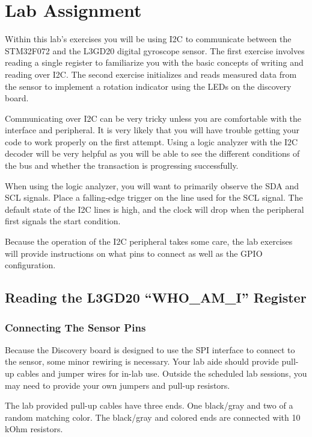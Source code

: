 \documentclass[openany,11pt,fleqn]{book} %
\begin{document}
\section{Lab Assignment}
Within this lab's exercises you will be using I2C to communicate between the STM32F072 and the L3GD20 digital gyroscope sensor. The first exercise involves reading a single register to familiarize you with the basic concepts of writing and reading over I2C. The second exercise initializes and reads measured data from the sensor to  implement a rotation indicator using the LEDs on the discovery board. 

Communicating over I2C can be very tricky unless you are comfortable with the interface and peripheral. It is very likely that you will have trouble getting your code to work properly on the first attempt. Using a logic analyzer with the I2C decoder will be very helpful as you will be able to see the different conditions of the bus and whether the transaction is progressing successfully. 

When using the logic analyzer, you will want to primarily observe the SDA and SCL signals. Place a falling-edge trigger on the line used for the SCL signal. The default state of the I2C lines is high, and the clock will drop when the peripheral first signals the start condition.  

Because the operation of the I2C peripheral takes some care, the lab exercises will provide instructions on what pins to connect as well as the GPIO configuration. 

\subsection{Reading the L3GD20 ``WHO\_AM\_I'' Register}
\subsubsection{Connecting The Sensor Pins}
Because the Discovery board is designed to use the SPI interface to connect to the sensor, some minor rewiring is necessary. Your lab aide should provide pull-up cables and jumper wires for in-lab use. Outside the scheduled lab sessions, you may need to provide your own jumpers and pull-up resistors. 

The lab provided pull-up cables have three ends. One black/gray and two of a random matching color. The black/gray and colored ends are connected with 10 kOhm resistors. 
\end{document}

